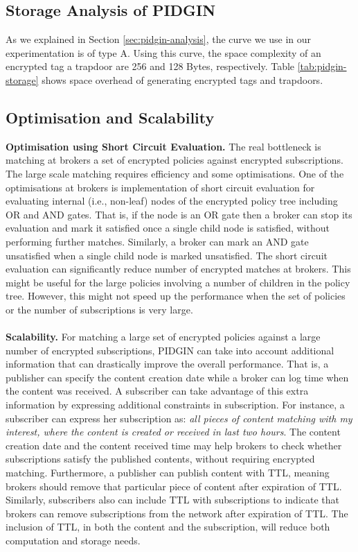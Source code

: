 \documentclass[epsfig,a4paper,11pt,titlepage]{book}
\numberwithin{algorithm}{chapter}
\begin{document}
\subsection[Storage Analysis of PIDGIN]{Storage Analysis of \gls{PIDGIN}}

As we explained in Section \ref{sec:pidgin-analysis}, the curve we use in our experimentation is of type A. Using this curve, the space complexity of an encrypted tag a trapdoor are 256 and 128 Bytes, respectively. Table \ref{tab:pidgin-storage} shows space overhead of generating encrypted tags and trapdoors.

\subsection{Optimisation and Scalability}
\label{sec:pidgin-optimisation}

\noindent \textbf{Optimisation using Short Circuit Evaluation.} The real bottleneck is matching at brokers a set of encrypted policies against encrypted subscriptions. The large scale matching requires efficiency and some optimisations. One of the optimisations at brokers is implementation of short circuit evaluation for evaluating internal (i.e., non-leaf) nodes of the encrypted policy tree including OR and AND gates. That is, if the node is an OR gate then a broker can stop its evaluation and mark it satisfied once a single child node is satisfied, without performing further matches. Similarly, a broker can mark an AND gate unsatisfied when a single child node is marked unsatisfied. The short circuit evaluation can significantly reduce number of encrypted matches at brokers. This might be useful for the large policies involving a number of children in the policy tree. However, this might not speed up the performance when the set of policies or the number of subscriptions is very large. \\ \\
\noindent \textbf{Scalability.} For matching a large set of encrypted policies against a large number of encrypted subscriptions, \gls{PIDGIN} can take into account additional information that can drastically improve the overall performance. That is, a publisher can specify the content creation date while a broker can log time when the content was received. A subscriber can take advantage of this extra information by expressing additional constraints in subscription. For instance, a subscriber can express her subscription as: \emph{all pieces of content matching with my interest, where the content is created or received in last two hours}. The content creation date and the content received time may help brokers to check whether subscriptions satisfy the published contents, without requiring encrypted matching. Furthermore, a publisher can publish content with \gls{TTL}, meaning brokers should remove that particular piece of content after expiration of \gls{TTL}. Similarly, subscribers also can include \gls{TTL} with subscriptions to indicate that brokers can remove subscriptions from the network after expiration of \gls{TTL}. The inclusion of \gls{TTL}, in both the content and the subscription, will reduce both computation and storage needs.
\end{document}
